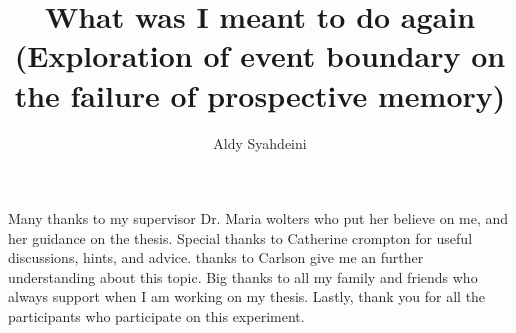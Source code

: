 \documentclass[msc,frontabs,logo,twoside,deptreport]{infthesis}
\title{What was I meant to do again (Exploration of event boundary on the failure of prospective memory)}
\author{Aldy Syahdeini}
\begin{document}
\begin{preliminary}

\maketitle

\begin{acknowledgements}
Many thanks to my supervisor Dr. Maria wolters who put her believe on me, and her guidance
on the thesis.
Special thanks to Catherine crompton for useful discussions, hints, and
advice.
thanks to Carlson give me an further understanding about this topic.
Big thanks to all my family and friends who always support when I am working on my thesis.
Lastly, thank you for all the participants who participate on this experiment.


\end{acknowledgements}

\standarddeclaration


\tableofcontents


\end{preliminary}









% 

\appendix












\end{document}
